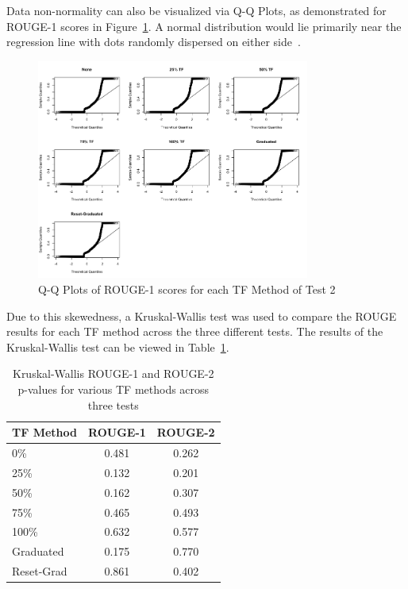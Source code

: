 Data non-normality can also be visualized via Q-Q Plots, as demonstrated for ROUGE-1 scores in Figure~\ref{fig:qqs}. A normal distribution would lie primarily near the regression line with dots randomly dispersed on either side~\cite{Ford2015}.

\begin{figure}[h]
  \centering
  \includegraphics[width=0.8\textwidth]{../plots/test2/qqs}
  \caption{Q-Q Plots of ROUGE-1 scores for each TF Method of Test 2}
  \label{fig:qqs}
\end{figure}

Due to this skewedness, a Kruskal-Wallis test was used to compare the ROUGE results for each TF method across the three different tests. The results of the Kruskal-Wallis test can be viewed in Table~\ref{tab:kruskal}.

\begin{table}[h]
  \centering
  \begin{tabular}{| l | c | c |}
    \hline
    TF Method & ROUGE-1 & ROUGE-2\\
    \hline
    0\% & 0.481 & 0.262  \\
    25\% & 0.132 & 0.201  \\
    50\% & 0.162 & 0.307  \\
    75\% & 0.465 & 0.493  \\
    100\% & 0.632 & 0.577  \\
    Graduated & 0.175 & 0.770  \\
    Reset-Grad & 0.861 & 0.402  \\
    \hline
  \end{tabular}
  \caption{Kruskal-Wallis ROUGE-1 and ROUGE-2 p-values for various TF methods across three tests}
  \label{tab:kruskal}
\end{table}

